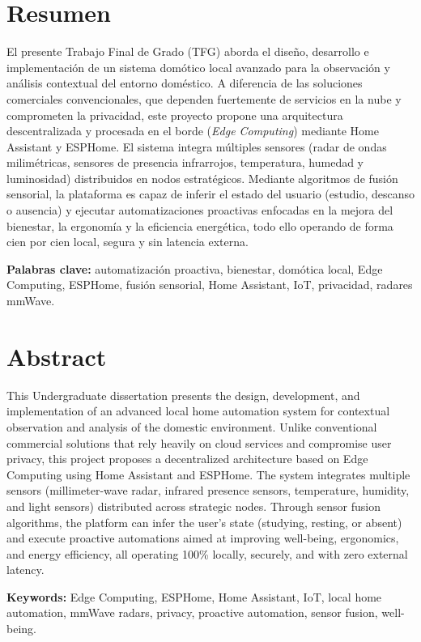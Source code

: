 \documentclass[a4paper, 12pt]{article}
\begin{document}
\section*{Resumen}
El presente Trabajo Final de Grado (TFG) aborda el diseño, desarrollo e implementación de un sistema domótico local avanzado para la observación y análisis contextual del entorno doméstico. A diferencia de las soluciones comerciales convencionales, que dependen fuertemente de servicios en la nube y comprometen la privacidad, este proyecto propone una arquitectura descentralizada y procesada en el borde (\textit{Edge Computing}) mediante Home Assistant y ESPHome. El sistema integra múltiples sensores (radar de ondas milimétricas, sensores de presencia infrarrojos, temperatura, humedad y luminosidad) distribuidos en nodos estratégicos. Mediante algoritmos de fusión sensorial, la plataforma es capaz de inferir el estado del usuario (estudio, descanso o ausencia) y ejecutar automatizaciones proactivas enfocadas en la mejora del bienestar, la ergonomía y la eficiencia energética, todo ello operando de forma cien por cien local, segura y sin latencia externa.

\vspace{1cm}
\noindent \textbf{Palabras clave:} automatización proactiva, bienestar, domótica local, Edge Computing, ESPHome, fusión sensorial, Home Assistant, IoT, privacidad, radares mmWave.
\clearpage

\thispagestyle{empty}
\section*{Abstract}
This Undergraduate dissertation presents the design, development, and implementation of an advanced local home automation system for contextual observation and analysis of the domestic environment. Unlike conventional commercial solutions that rely heavily on cloud services and compromise user privacy, this project proposes a decentralized architecture based on Edge Computing using Home Assistant and ESPHome. The system integrates multiple sensors (millimeter-wave radar, infrared presence sensors, temperature, humidity, and light sensors) distributed across strategic nodes. Through sensor fusion algorithms, the platform can infer the user's state (studying, resting, or absent) and execute proactive automations aimed at improving well-being, ergonomics, and energy efficiency, all operating 100\% locally, securely, and with zero external latency.

\vspace{1cm}
\noindent \textbf{Keywords:} Edge Computing, ESPHome, Home Assistant, IoT, local home automation, mmWave radars, privacy, proactive automation, sensor fusion, well-being.
\clearpage
\end{document}
